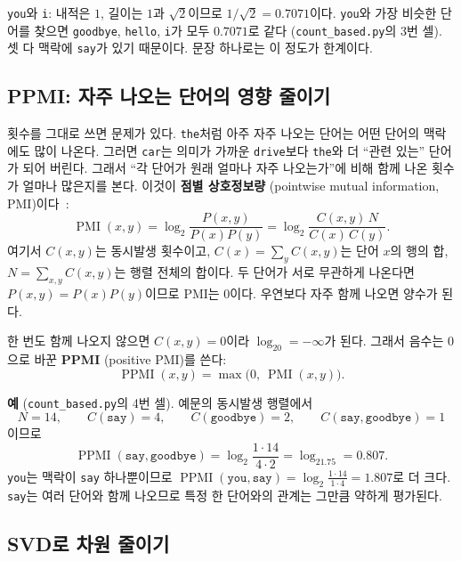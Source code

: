 \documentclass[11pt,a4paper]{article}
\newcommand{\w}[1]{\texttt{#1}}
\begin{document}
\w{you}와 \w{i}: 내적은 $1$, 길이는 $1$과 $\sqrt2$이므로 $1/\sqrt2=0.7071$이다.
\w{you}와 가장 비슷한 단어를 찾으면 \w{goodbye}, \w{hello}, \w{i}가 모두 $0.7071$로 같다 (\texttt{count\_based.py}의 3번 셀).
셋 다 맥락에 \w{say}가 있기 때문이다. 문장 하나로는 이 정도가 한계이다.

\subsection{PPMI: 자주 나오는 단어의 영향 줄이기}

횟수를 그대로 쓰면 문제가 있다. \w{the}처럼 아주 자주 나오는 단어는 어떤 단어의 맥락에도 많이 나온다.
그러면 \w{car}는 의미가 가까운 \w{drive}보다 \w{the}와 더 ``관련 있는'' 단어가 되어 버린다.
그래서 ``각 단어가 원래 얼마나 자주 나오는가''에 비해 함께 나온 횟수가 얼마나 많은지를 본다. 이것이 \textbf{점별 상호정보량} (pointwise mutual information, PMI)이다~\cite{church1990}:
\begin{equation}
\operatorname{PMI}(x,y)=\log_2\frac{P(x,y)}{P(x)P(y)}=\log_2\frac{C(x,y)\,N}{C(x)\,C(y)} .
\end{equation}
여기서 $C(x,y)$는 동시발생 횟수이고, $C(x)=\sum_yC(x,y)$는 단어 $x$의 행의 합, $N=\sum_{x,y}C(x,y)$는 행렬 전체의 합이다.
두 단어가 서로 무관하게 나온다면 $P(x,y)=P(x)P(y)$이므로 PMI는 $0$이다. 우연보다 자주 함께 나오면 양수가 된다.

한 번도 함께 나오지 않으면 $C(x,y)=0$이라 $\log_20=-\infty$가 된다. 그래서 음수는 $0$으로 바꾼 \textbf{PPMI} (positive PMI)를 쓴다:
\begin{equation}
\operatorname{PPMI}(x,y)=\max\big(0,\ \operatorname{PMI}(x,y)\big).
\end{equation}

\textbf{예} (\texttt{count\_based.py}의 4번 셀). 예문의 동시발생 행렬에서
\begin{equation}
N=14,\qquad C(\w{say})=4,\qquad C(\w{goodbye})=2,\qquad C(\w{say},\w{goodbye})=1
\end{equation}
이므로
\begin{equation}
\operatorname{PPMI}(\w{say},\w{goodbye})=\log_2\frac{1\cdot14}{4\cdot2}=\log_21.75=0.807 .
\end{equation}
\w{you}는 맥락이 \w{say} 하나뿐이므로 $\operatorname{PPMI}(\w{you},\w{say})=\log_2\frac{1\cdot14}{1\cdot4}=1.807$로 더 크다.
\w{say}는 여러 단어와 함께 나오므로 특정 한 단어와의 관계는 그만큼 약하게 평가된다.

\subsection{SVD로 차원 줄이기}
\end{document}
